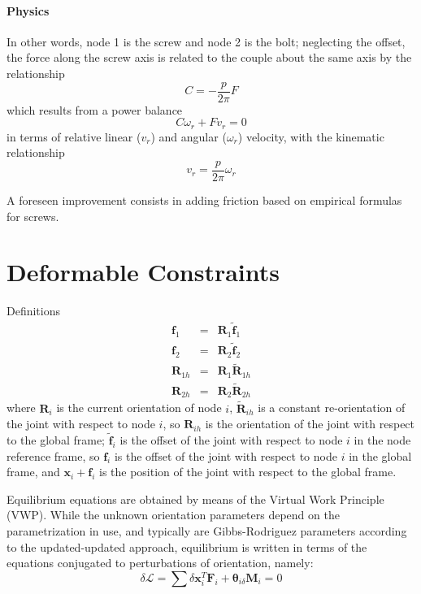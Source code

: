 \documentclass[10pt,dvips,fleqn]{report}
\newcommand{\T}[1]{\boldsymbol{#1}}
\begin{document}
\paragraph{Physics}
In other words, node 1 is the screw and node 2 is the bolt;
neglecting the offset, the force along the screw axis is related
to the couple about the same axis by the relationship
\begin{equation}
	C = - \frac{p}{2\pi} F
\end{equation}
which results from a power balance
\begin{equation}
	C \omega_r + F v_r = 0
\end{equation}
in terms of relative linear ($v_r$) and angular ($\omega_r$) velocity,
with the kinematic relationship
\begin{equation} 
	v_r = \frac{p}{2\pi} \omega_r
\end{equation}

A foreseen improvement consists in adding friction based on empirical
formulas for screws.







\section{Deformable Constraints}
Definitions
\begin{eqnarray*}
	\T{f}_1 & = & \T{R}_1 \tilde{\T{f}}_1 \\
	\T{f}_2 & = & \T{R}_2 \tilde{\T{f}}_2 \\
	\T{R}_{1h} & = & \T{R}_1 \tilde{\T{R}}_{1h} \\
	\T{R}_{2h} & = & \T{R}_2 \tilde{\T{R}}_{2h}
\end{eqnarray*}
where $\T{R}_i$ is the current orientation of node $i$, 
$\tilde{\T{R}}_{ih}$ is a constant re-orientation of the joint
with respect to node $i$, so $\T{R}_{ih}$ is the orientation
of the joint with respect to the global frame;
$\tilde{\T{f}}_i$ is the offset of the joint with respect to
node $i$ in the node reference frame, so $\T{f}_i$ is the offset 
of the joint with respect to node $i$ in the global frame, and
$\T{x}_i+\T{f}_i$ is the position of the joint with respect 
to the global frame.

Equilibrium equations are obtained by means of the Virtual Work
Principle (VWP).
While the unknown orientation parameters depend on the parametrization 
in use, and typically are Gibbs-Rodriguez parameters according 
to the updated-updated approach, equilibrium is written in terms
of the equations conjugated to perturbations of orientation,
namely:
\begin{equation}
	\delta\mathcal{L} = \sum \delta\T{x}_i^T \T{F}_i
	+ \T{\theta}_{i\delta} \T{M}_i = 0
\end{equation}
\end{document}
